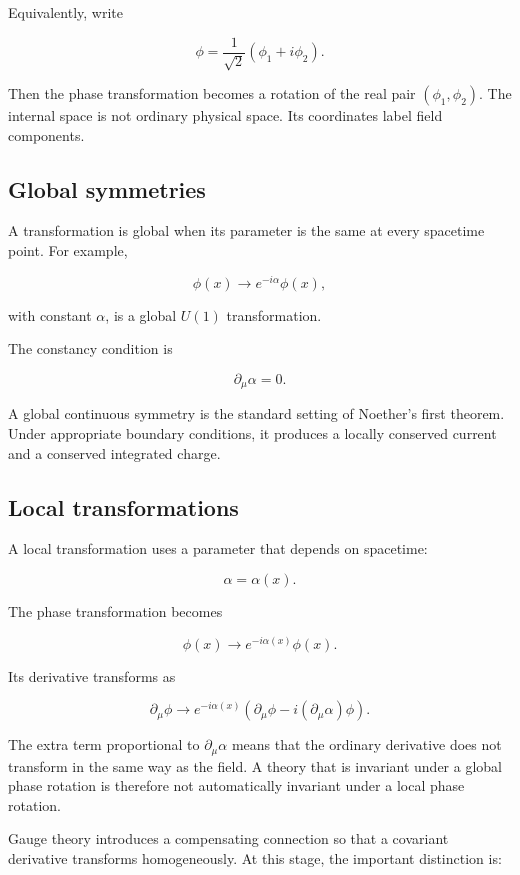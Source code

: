 Equivalently, write

\[
\phi
=
\frac{1}{\sqrt{2}}
\left(
\phi_1+i\phi_2
\right).
\]

Then the phase transformation becomes a rotation of the real pair \((\phi_1,\phi_2)\). The internal space is not ordinary physical space. Its coordinates label field components.

\subsection{Global symmetries}

A transformation is global when its parameter is the same at every spacetime point. For example,

\[
\phi(x)
\longrightarrow
e^{-i\alpha}\phi(x),
\]

with constant \(\alpha\), is a global \(U(1)\) transformation.

The constancy condition is

\[
\partial_{\mu}\alpha=0.
\]

A global continuous symmetry is the standard setting of Noether's first theorem. Under appropriate boundary conditions, it produces a locally conserved current and a conserved integrated charge.

\subsection{Local transformations}

A local transformation uses a parameter that depends on spacetime:

\[
\alpha
=
\alpha(x).
\]

The phase transformation becomes

\[
\phi(x)
\longrightarrow
e^{-i\alpha(x)}\phi(x).
\]

Its derivative transforms as

\[
\partial_{\mu}\phi
\longrightarrow
e^{-i\alpha(x)}
\left(
\partial_{\mu}\phi
-
i
(\partial_{\mu}\alpha)\phi
\right).
\]

The extra term proportional to \(\partial_{\mu}\alpha\) means that the ordinary derivative does not transform in the same way as the field. A theory that is invariant under a global phase rotation is therefore not automatically invariant under a local phase rotation.

Gauge theory introduces a compensating connection so that a covariant derivative transforms homogeneously. At this stage, the important distinction is:


